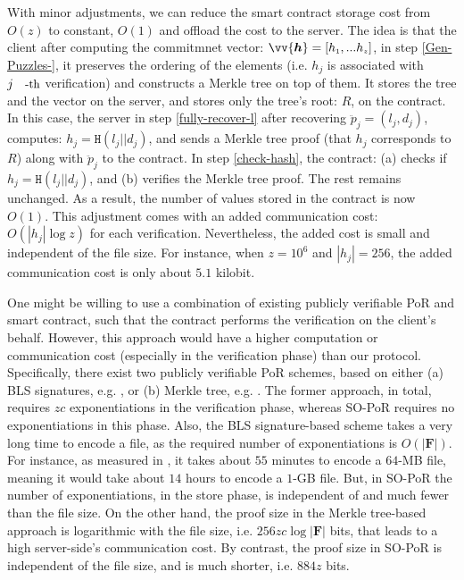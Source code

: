 \begin{remark}
With minor adjustments, we can reduce the smart contract storage cost from $O(z)$ to constant, $O(1)$ and offload the cost to the server. The idea is that the client after computing the commitmnet vector: $\vv{\bm{h}}=[h_{\scriptscriptstyle 1},...h_{\scriptscriptstyle z}]$,  in step \ref{Gen-Puzzles-}, it preserves the ordering of the elements (i.e. $h_{\scriptscriptstyle j}$ is associated with $j\text{\small{-th}}$ verification) and constructs a  Merkle tree  on top of them. It stores the tree and the vector on the server, and stores only the tree's  root: $R$, on the contract. In this case,  the server in step \ref{fully-recover-l} after recovering $\ddot{p}_{\scriptscriptstyle j}= (l_{\scriptscriptstyle j}, d_{\scriptscriptstyle j})$,  computes: $h_{\scriptscriptstyle j}=\mathtt{H}(l_{\scriptscriptstyle j}||d_{\scriptscriptstyle j})$, and sends a Merkle tree proof (that $h_{\scriptscriptstyle j}$ corresponds to  $R$) along with $\ddot{p}_{\scriptscriptstyle j}$ to the contract. In step \ref{check-hash}, the contract: (a) checks if $h_{\scriptscriptstyle j}=\mathtt{H}(l_{\scriptscriptstyle j}||d_{\scriptscriptstyle j})$, and  (b) verifies the Merkle tree proof.  The rest  remains unchanged.  As a result, the number of values stored in the contract is now $O(1)$. This adjustment comes with an added communication cost: $O(|h_{\scriptscriptstyle j}|\log z)$ for each verification. Nevertheless, the added cost is small and independent of the file size.   For instance, when  $z=10^{\scriptscriptstyle 6}$ and $|h_{\scriptscriptstyle j}|=256$, the  added communication cost is only about $5.1$ kilobit.

\end{remark}

\begin{remark}
One might be willing to use a combination of existing publicly verifiable PoR and smart contract, such that the contract performs the verification on the client's behalf. However, this approach would have a higher computation or communication cost (especially in the verification phase) than our protocol. Specifically,  there exist two publicly verifiable PoR schemes, based on either (a) BLS signatures, e.g. \cite{DBLP:conf/asiacrypt/ShachamW08}, or (b) Merkle tree, e.g. \cite{MillerPermacoin}. The former approach, in total, requires  $zc$ exponentiations in the verification phase, whereas SO-PoR requires no exponentiations in this phase. Also, the BLS signature-based scheme takes a very long time to encode  a file, as the required number of exponentiations is  $O(|{\bm{F}}|)$. For instance, as measured in \cite{armknecht2014outsourced}, it takes about $55$ minutes to encode a  $64$-MB file,  meaning  it would take about $14$ hours to encode a $1$-GB file. But, in SO-PoR the number of exponentiations, in the store phase, is independent of and much fewer than the file size. On the other hand, the proof size in the Merkle tree-based approach is logarithmic with the file size, i.e. $256zc\log |{\bm{F}}|$ bits, that leads to a high server-side's communication cost. By contrast,  the proof size in SO-PoR is  independent of the file size, and is much shorter, i.e. $884z$ bits. 


\end{remark}

